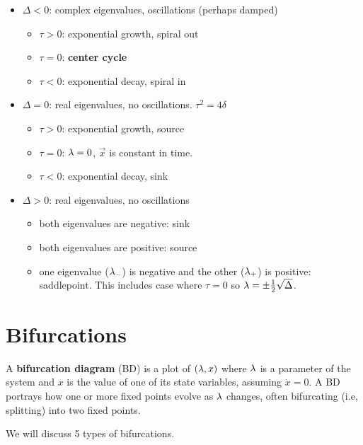 \begin{itemize}
\item $\Delta < 0$:
complex eigenvalues,
oscillations (perhaps damped)
\begin{itemize}[\checkmark]
\item $\tau>0$: exponential growth, spiral out
\item $\tau=0$: {\bf center cycle}
\item $\tau<0$: exponential decay, spiral in
\end{itemize}


\item $\Delta = 0$:
real eigenvalues,
no oscillations. $\tau^2 = 4\delta$
\begin{itemize}[\checkmark]
\item $\tau>0$: exponential growth, source
\item $\tau=0$: $\lambda=0$, $\vec{x}$ is constant in time.
\item $\tau<0$: exponential decay, sink
\end{itemize}

\item $\Delta > 0$:
real eigenvalues,
no oscillations 

\begin{itemize}[\checkmark]
\item both eigenvalues are negative: sink
\item both eigenvalues are positive: source
\item one eigenvalue ($\lambda_-$) is negative 
and the other ($\lambda_+$) is positive: saddlepoint. This 
includes case where $\tau=0$ so $\lambda =\pm\frac{1}{2}\sqrt{\Delta}$.
\end{itemize}
\end{itemize}
\section{Bifurcations}

A {\bf bifurcation diagram}
(BD)
is a plot of $(\lambda, x)$
where $\lambda$ is
a parameter of the
system and $x$
is the value of one
of its  state
variables, assuming 
$\dot{x}=0$. A BD portrays
how one or more fixed points evolve
as $\lambda$ changes, often 
bifurcating (i.e, splitting) into two fixed points.

We will  discuss 5 types of bifurcations.

